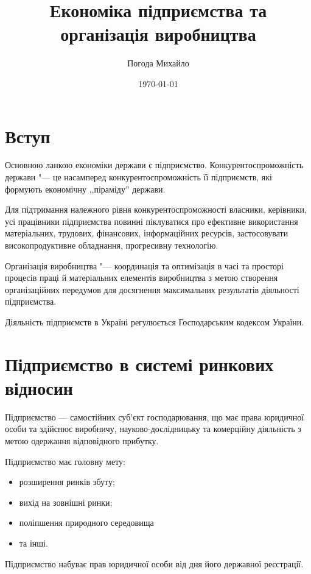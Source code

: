 \documentclass[a4paper,10pt,notitlepage,pdftex,headsepline]{scrartcl}
\author{Погода Михайло}
\title{Економіка підприємства та організація виробництва}
\date{\today}
\begin{document}
\begin{titlepage}
  \maketitle
\end{titlepage}

\tableofcontents
\newpage

\section{Вступ}
  Основною ланкою економіки держави є підприємство.
  Конкурентоспроможність держави "--- це насамперед конкурентоспроможність її
  підприємств, які формують економічну ,,піраміду'' держави.

  Для підтримання належного рівня конкурентоспроможності власники, керівники,
  усі працівники підприємства повинні піклуватися про ефективне використання
  матеріальних, трудових, фінансових, інформаційних ресурсів, застосовувати
  високопродуктивне обладнання, прогресивну технологію.

  Організація виробництва "--- координація та оптимізація в часі та просторі
  процесів праці й матеріальних елементів виробництва з метою створення
  організаційних передумов для досягнення максимальних результатів діяльності
  підприємства.

  Діяльність підприємств в Україні регулюється Господарським кодексом України.

\section{Підприємство в системі ринкових відносин}

  Підприємство --- самостійних суб’єкт господарювання, що має права
  юридичної особи та здійснює виробничу, науково-дослідницьку та комерційну
  діяльність з метою одержання відповідного прибутку.

  Підприємство має головну мету:
  \begin{itemize}
    \item розширення ринків збуту;
    \item вихід на зовнішні ринки;
    \item поліпшення природного середовища
    \item та інші.
  \end{itemize}

  Підприємство набуває прав юридичної особи від дня його державної
  реєстрації.
\end{document}
